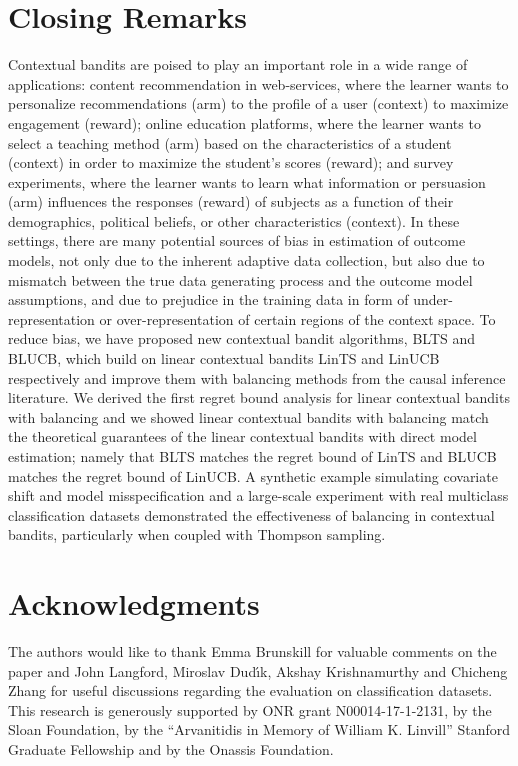 \documentclass[letterpaper]{article} %
\begin{document}
\vspace{-0.93mm}
\vspace{-1.62mm}
\section{Closing Remarks}
Contextual bandits are poised to play an important role in a wide range of applications:
content recommendation in web-services, where the learner wants to personalize recommendations (arm) to the profile of a user (context) to maximize engagement (reward);  online education platforms, where the learner wants to select a teaching method (arm) based on the characteristics of a student (context) in order to maximize the student's scores (reward); and survey experiments, where the learner wants to learn what information or persuasion (arm) influences the responses (reward) of subjects as a function of their demographics, political beliefs, or other characteristics (context).
In these settings, there are many potential sources of bias in estimation of outcome models, not only due to the inherent adaptive data collection, but also due to mismatch between the true data generating process and the outcome model assumptions, and due to prejudice in the training data in form of under-representation or over-representation of certain regions of the context space.
To reduce bias, we have proposed new contextual bandit algorithms, BLTS and BLUCB, which build on linear contextual bandits LinTS and LinUCB respectively and improve them with balancing methods from the causal inference literature.  We derived the first regret bound analysis for linear contextual bandits with balancing and we showed linear contextual bandits with balancing match the theoretical guarantees of the linear contextual bandits with direct model estimation; namely that BLTS matches the regret bound of LinTS and BLUCB matches the regret bound of LinUCB.
A synthetic example simulating covariate shift and model misspecification and a large-scale experiment with real multiclass classification datasets demonstrated the effectiveness of balancing in contextual bandits, particularly when coupled with Thompson sampling.


\vspace{-0.81mm}
\vspace{-1.43mm}
\section{Acknowledgments}
The authors would like to thank Emma Brunskill for valuable comments on the paper and John Langford, Miroslav Dud{\'\i}k, Akshay Krishnamurthy and Chicheng Zhang for useful discussions regarding the evaluation on classification datasets.
This research is generously supported by ONR grant N00014-17-1-2131, by the Sloan Foundation, by the ``Arvanitidis in Memory of William K. Linvill'' Stanford Graduate Fellowship and by the Onassis Foundation.
\end{document}
